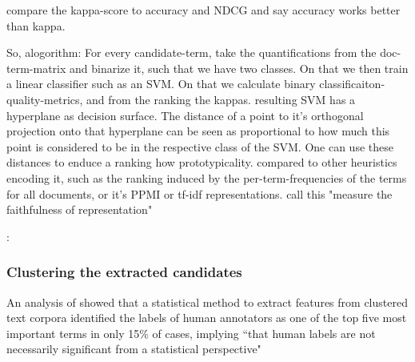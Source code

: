 \textcite{Ager2018} compare the kappa-score to accuracy and NDCG and say accuracy works better than kappa.

So, alogorithm: For every candidate-term, take the quantifications from the doc-term-matrix and binarize it, such that we have two classes. On that we then train a linear classifier such as an SVM. On that we calculate binary classificaiton-quality-metrics, and from the ranking the kappas. resulting SVM has a hyperplane as decision surface. The distance of a point to it's orthogonal projection onto that hyperplane can be seen as proportional to how much this point is considered to be in the respective class of the SVM. One can use these distances to enduce a ranking how prototypicality. compared to other heuristics encoding it, such as the ranking induced by the per-term-frequencies of the terms for all documents, or it's PPMI or tf-idf representations.
\cite{Derrac2015} call this "measure the faithfulness of representation"

\cite{Ager2018}: 



\subsubsection{Clustering the extracted candidates}
\label{sec:algo:cluster}




An analysis of \cite{Carmel2009} showed that a statistical method to extract features from clustered text corpora identified the labels of human annotators as one of the top five most important terms in only 15\% of cases, implying ``that human labels are not necessarily significant from a statistical perspective" \cite[139]{Carmel2009}


